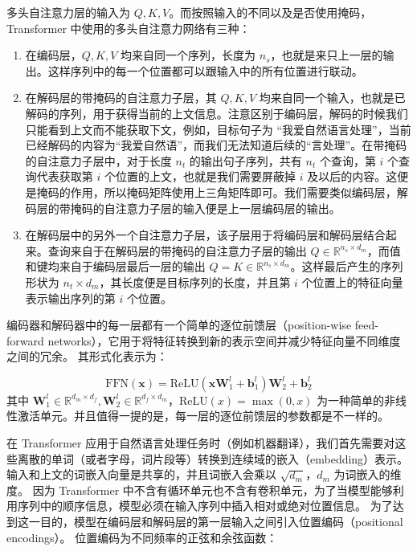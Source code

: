 多头自注意力层的输入为 $Q,K,V$。而按照输入的不同以及是否使用掩码，Transformer 中使用的多头自注意力网络有三种：

\begin{enumerate}[(1)]
	\item 在编码层，$Q,K,V$ 均来自同一个序列，长度为 $n_s$，也就是来只上一层的输出。这样序列中的每一个位置都可以跟输入中的所有位置进行联动。
	\item 在解码层的带掩码的自注意力子层，其 $Q,K,V$ 均来自同一个输入，也就是已解码的序列，用于获得当前的上文信息。注意区别于编码层，解码的时候我们只能看到上文而不能获取下文，例如，目标句子为 “我爱自然语言处理”，当前已经解码的内容为“我爱自然语”，而我们无法知道后续的“言处理”。在带掩码的自注意力子层中，对于长度 $n_t$ 的输出句子序列，共有 $n_t$ 个查询，第 $i$ 个查询代表获取第 $i$ 个位置的上文，也就是我们需要屏蔽掉 $i$ 及以后的内容。这便是掩码的作用，所以掩码矩阵使用上三角矩阵即可。我们需要类似编码层，解码层的带掩码的自注意力子层的输入便是上一层编码层的输出。
	\item 在解码层中的另外一个自注意力子层，该子层用于将编码层和解码层结合起来。查询来自于在解码层的带掩码的自注意力子层的输出 $Q \in \mathbb{R}^{n_s \times d_m}$，而值和键均来自于编码层最后一层的输出 $Q = K \in \mathbb{R}^{n_s \times d_m}$。这样最后产生的序列形状为 $n_t \times d_m$，其长度便是目标序列的长度，并且第 $i$ 个位置上的特征向量表示输出序列的第 $i$ 个位置。
\end{enumerate}

编码器和解码器中的每一层都有一个简单的逐位前馈层（position-wise feed-forward networks），它用于将特征转换到新的表示空间并减少特征向量不同维度之间的冗余。
其形式化表示为：

\begin{equation}
	\text{FFN}(\bm{x}) = \text{ReLU}(\bm{x} \bm{W}_1^{l} + \bm{b}_1^{l}) \bm{W}_2^{l} + \bm{b}_2^{l}
\end{equation}
其中 $\bm{W}_1^{l} \in \mathbb{R}^{d_m \times d_f}, \bm{W}_2^{l} \in \mathbb{R}^{d_f \times d_m}$，$\text{ReLU}(x) = \max(0, x)$ 为一种简单的非线性激活单元。并且值得一提的是，每一层的逐位前馈层的参数都是不一样的。

在 Transformer 应用于自然语言处理任务时（例如机器翻译），我们首先需要对这些离散的单词（或者字母，词片段等）转换到连续域的嵌入（embedding）表示。
输入和上文的词嵌入向量是共享的，并且词嵌入会乘以 $\sqrt{d_m}$，$d_m$ 为词嵌入的维度。
因为 Transformer 中不含有循环单元也不含有卷积单元，为了当模型能够利用序列中的顺序信息，模型必须在输入序列中插入相对或绝对位置信息。
为了达到这一目的，模型在编码层和解码层的第一层输入之间引入位置编码（positional encodings）。
位置编码为不同频率的正弦和余弦函数：

